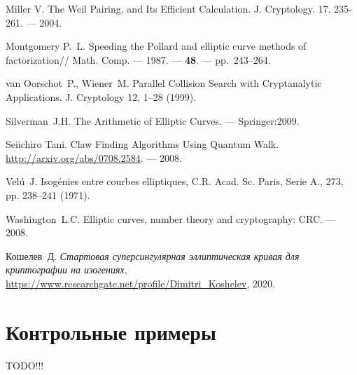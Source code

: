 \documentclass[a4paper,12pt]{article}
\theoremstyle{definition}
\begin{document}
\begin{thebibliography}{1}

 Miller V.  The Weil Pairing, and Its Efficient Calculation. J. Cryptology. 17. 235-261. --- 2004. 

Montgomery P.~L.
\newblock
\newblock Speeding the {P}ollard and elliptic curve methods of factorization//
  Math. Comp.
\newblock --- 1987. --- {\bf 48}. --- pp.~243--264.


 van Oorschot~P., Wiener~M. Parallel Collision Search with Cryptanalytic Applications. J. Cryptology 12, 1–28 (1999).



Silverman~J.H.
\newblock The Arithmetic of Elliptic Curves. 
--- Springer:2009.



  Seiichiro Tani. 
  \newblock Claw Finding Algorithms Using Quantum Walk. \url{http://arxiv.org/abs/0708.2584}. --- 2008.
  
  
   Vel\'{u}~J. \newblock Isog\'{e}nies entre courbes elliptiques, C.R. Acad. Sc. Paris, Serie A., 273, pp. 238–241 (1971).

Washington~L.C.
\newblock Elliptic curves, number theory and cryptography: CRC.
\newblock --- 2008.


 Кошелев~Д. {\it Стартовая суперсингулярная эллиптическая кривая для криптографии на изогениях}, \url{https://www.researchgate.net/profile/Dimitri_Koshelev}, 2020.


\end{thebibliography}

\newpage 

\appendix
\section{Контрольные примеры}

TODO!!!
\end{document}
